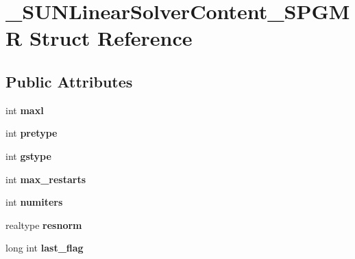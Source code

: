 \hypertarget{struct__SUNLinearSolverContent__SPGMR}{}\section{\+\_\+\+S\+U\+N\+Linear\+Solver\+Content\+\_\+\+S\+P\+G\+MR Struct Reference}
\label{struct__SUNLinearSolverContent__SPGMR}
\subsection*{Public Attributes}
\begin{DoxyCompactItemize}
\item 
\mbox{\label{struct__SUNLinearSolverContent__SPGMR_ad7106a4026087e1b6b94deb5f39ab365}} 
int {\bfseries maxl}
\item 
\mbox{\label{struct__SUNLinearSolverContent__SPGMR_a1cec129a40b667f73a97636b64c13291}} 
int {\bfseries pretype}
\item 
\mbox{\label{struct__SUNLinearSolverContent__SPGMR_a55798203b2c5d8d605c496b50d15a63e}} 
int {\bfseries gstype}
\item 
\mbox{\label{struct__SUNLinearSolverContent__SPGMR_a7e1d70a85df169c3f02225e610e69fdf}} 
int {\bfseries max\+\_\+restarts}
\item 
\mbox{\label{struct__SUNLinearSolverContent__SPGMR_a8641e5b4a09fa930217ffa694670772c}} 
int {\bfseries numiters}
\item 
\mbox{\label{struct__SUNLinearSolverContent__SPGMR_ac5aae425fae0981689dc0472d2e12504}} 
realtype {\bfseries resnorm}
\item 
\mbox{\label{struct__SUNLinearSolverContent__SPGMR_a2f302698c5bcaefa94ed02c415076b7a}} 
long int {\bfseries last\+\_\+flag}
\item 
\mbox{\label{struct__SUNLinearSolverContent__SPGMR_a2475187eedb6366808987cb627ba2e68}} 

\end{DoxyCompactItemize}
